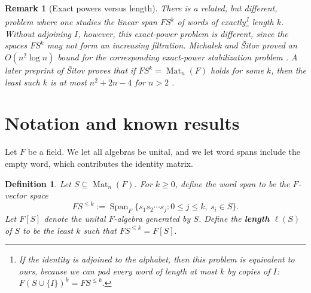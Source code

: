 \documentclass[11pt]{article}
\renewcommand{\geq}{\geqslant}
\renewcommand{\leq}{\leqslant}
\newcommand{\calL}{\mathcal{L}}
\newcommand{\Mat}{\operatorname{Mat}}
\newcommand{\Span}{\operatorname{Span}}
\newcommand{\union}{\cup} %
\newtheorem{auxiliary proposition}[theorem]{Auxiliary Proposition}
\newtheorem{definition}[theorem]{Definition}
\newtheorem{main conjecture}[theorem]{Main Conjecture}
\newtheorem{main theorem}[theorem]{Main Theorem}
\newtheorem{modesty proposition}[theorem]{Modesty Proposition}
\newtheorem{open problem}[theorem]{Open Problem}
\newtheorem{remark}[theorem]{Remark}
\newtheorem{convergence lemma}[theorem]{Convergence Lemma}
\newtheorem{corrected lemma}[theorem]{Corrected Lemma}
\newtheorem{growth lemma}[theorem]{Growth Lemma}
\newtheorem{coefficient lemma}[theorem]{Integrality Lemma}
\newtheorem{interpolation lemma}[theorem]{Interpolation Lemma}
\newtheorem{kernel lemma}[theorem]{Kernel Lemma}
\newtheorem{limit lemma}[theorem]{Limit Lemma}
\newtheorem{tandem lemma}[theorem]{Modesty Lemma}
\newtheorem{zero-finding lemma}[theorem]{Zero-Finding Lemma}
\numberwithin{equation}{section}
\begin{document}
\begin{remark}[Exact powers versus length]
There is a related, but different, problem where one studies the
linear span $FS^k$ of words of exactly\footnote{If the identity is
adjoined to the alphabet, then this problem is equivalent to ours, because we can pad every word of length at most $k$ by copies of
$I$:
$F(S\union\{I\})^k=FS^{\leq k}.$} length $k$. 
Without adjoining $I$, however, this exact-power problem is 
different, since the spaces $FS^k$ may not form an increasing filtration.
Micha{\l}ek and \v{S}itov proved an $O(n^2\log n)$ bound for the corresponding exact-power stabilization problem \cite[Theorem~1]{MichalekShitov2019}. %
A later preprint of
\v{S}itov proves that if
$FS^k=\Mat_n(F)$ holds for some $k$, then the least such $k$ is at most
$ n^2+2n-4 $
for $n>2$ \cite[Theorem~3]{ShitovGrowth2024}. 
\end{remark}

\section{Notation and known results}

Let $F$ be a field. We let all algebras be unital, and we let word spans include the empty word, which contributes the identity matrix.

\begin{definition}
Let $S\subseteq \Mat_n(F)$.  For $k\geq 0$, define the word span to be the $F$-vector space $$F S^{\leq k}:=\Span_F\{s_1s_2\cdots s_j:0\leq j\leq k,\ s_i\in S\}.$$
Let $F[S]$ denote the unital $F$-algebra generated by $S$.  Define the \textbf{length} $\ell(S)$ of $S$ to be the least $k$ such that $F S^{\leq k}=F[S].$

\end{definition}

\end{document}

